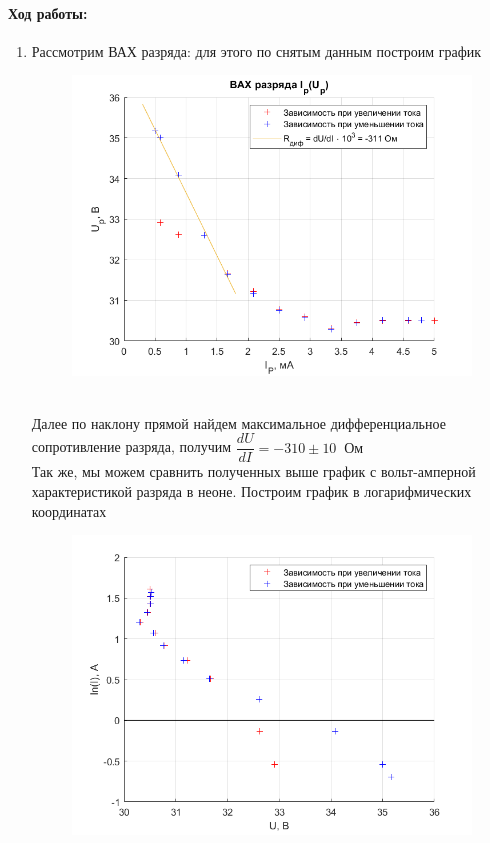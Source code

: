 \documentclass[a4paper,12pt]{article}
\begin{document}
\paragraph{Ход работы:}
\begin{enumerate}
\itemsep0em
\item Рассмотрим ВАХ разряда: для этого по снятым данным построим график
\begin{figure}[h!]
\centering
\includegraphics[scale=0.7]{graph_r.png}
\label{razr}
\caption{}
\end{figure}\\
 Далее по наклону прямой найдем максимальное дифференциальное  сопротивление разряда, получим $\dfrac{dU}{dI} = -310 \pm 10 \;\;\text{Ом}$\\
 Так же, мы можем сравнить полученных выше график с вольт-амперной характеристикой разряда в неоне. Построим график в логарифмических координатах
 \begin{figure}[h!]
 \centering
\includegraphics[scale=0.7]{graph_r_log.png}

\end{figure}
\end{enumerate}
\end{document}
